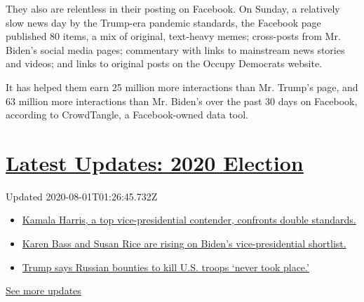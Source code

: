 They also are relentless in their posting on Facebook. On Sunday, a
relatively slow news day by the Trump-era pandemic standards, the
Facebook page published 80 items, a mix of original, text-heavy memes;
cross-posts from Mr. Biden's social media pages; commentary with links
to mainstream news stories and videos; and links to original posts on
the Occupy Democrats website.

It has helped them earn 25 million more interactions than Mr. Trump's
page, and 63 million more interactions than Mr. Biden's over the past 30
days on Facebook, according to CrowdTangle, a Facebook-owned data tool.

\hypertarget{latest-updates-2020-election}{%
\section{\texorpdfstring{\href{https://www.nytimes3xbfgragh.onion/2020/07/31/us/elections/biden-vs-trump.html?action=click\&pgtype=Article\&state=default\&region=MAIN_CONTENT_1\&context=storylines_live_updates}{Latest
Updates: 2020
Election}}{Latest Updates: 2020 Election}}\label{latest-updates-2020-election}}

Updated 2020-08-01T01:26:45.732Z

\begin{itemize}
\tightlist
\item
  \href{https://www.nytimes3xbfgragh.onion/2020/07/31/us/elections/biden-vs-trump.html?action=click\&pgtype=Article\&state=default\&region=MAIN_CONTENT_1\&context=storylines_live_updates\#link-29fdff45}{Kamala
  Harris, a top vice-presidential contender, confronts double
  standards.}
\item
  \href{https://www.nytimes3xbfgragh.onion/2020/07/31/us/elections/biden-vs-trump.html?action=click\&pgtype=Article\&state=default\&region=MAIN_CONTENT_1\&context=storylines_live_updates\#link-13ec3d9c}{Karen
  Bass and Susan Rice are rising on Biden's vice-presidential
  shortlist.}
\item
  \href{https://www.nytimes3xbfgragh.onion/2020/07/31/us/elections/biden-vs-trump.html?action=click\&pgtype=Article\&state=default\&region=MAIN_CONTENT_1\&context=storylines_live_updates\#link-49e9a016}{Trump
  says Russian bounties to kill U.S. troops `never took place.'}
\end{itemize}

\href{https://www.nytimes3xbfgragh.onion/2020/07/31/us/elections/biden-vs-trump.html?action=click\&pgtype=Article\&state=default\&region=MAIN_CONTENT_1\&context=storylines_live_updates}{See
more updates}

